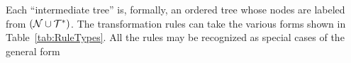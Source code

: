 \documentclass[10pt]{article}
\newcommand{\tabnum}[1]{\ref{tab:#1}}
\newcommand{\tabref}[1]{Table~\tabnum{#1}}
\begin{document}
\newcommand\tinyrhsA{\Tree[ .$\alpha$ [ .$C$ [ .$U$ $\epsilon$ ] [ .$\beta$ ] ] ]}
\newcommand\tinyrhsB{\Tree[ .$\alpha$ [ .$C$ [ .$\beta$ ] [ .$Y$ $\epsilon$ ] ] ]}
\newcommand\tinyrhsC{\Tree[ .$\alpha$ [ .$V$ $\epsilon$ ] [ .$C$ $\beta$ ] ]}
\newcommand\tinyrhsD{\Tree[ .$\alpha$ [ .$C$ $\beta$ ] [ .$X$ $\epsilon$ ] ]}
\newcommand\tinyrhsE{\Tree[ .$\alpha$ [ .$B$ [ .$C$ $\beta$ ] ] ]}
\newcommand\tinyrhsF{\abtree{C}}
 

\newcommand\rhs[6]{\Tree[ .$\alpha$ [ .$#1$ [ .$#3$ $\epsilon$ ] [ .$#2$ [ .$#4$ $\epsilon$ ] $\beta$ [ .$#5$ $\epsilon$ ] ] [ .$#6$ $\epsilon$ ] ] ]}
\newcommand\rhsnob[5]{\Tree[ .$\alpha$ $#2$ [ .$#1$ $#3$ $\beta$ $#4$ ] $#5$ ]}
\newcommand\rhsnoepsilon[6]{\Tree[ .$\alpha$ [ .$#1$ $#3$ [ .$#2$ $#4$ $\beta$ $#5$ ] $#6$ ] ]}
\newcommand\rhsnouvxy[2]{\Tree[ .$\alpha$ [ .$#1$ [ .$#2$ $\beta$ ] ] ]}

\newcommand\rhsGeneric{\rhs{B}{C}{U}{V}{X}{Y}}

\newcommand\rhsA{\Tree[ .$\alpha$ [ .$U$ $\epsilon$ ] [ .$C$ $v$ $\beta$ $x$ ] $y$ ]}
\newcommand\rhsB{\Tree[ .$\alpha$ $u$ [ .$C$ $v$ $\beta$ $x$ ] [ .$Y$ $\epsilon$ ] ]}
\newcommand\rhsC{\Tree[ .$\alpha$ $u$ [ .$C$ [ .$V$ $\epsilon$ ] $\beta$ $x$ ] $y$ ]}
\newcommand\rhsD{\Tree[ .$\alpha$ $u$ [ .$C$ $v$ $\beta$ [ .$X$ $\epsilon$ ] ] $y$ ]}
\newcommand\rhsE{\rhsnoepsilon{B}{C}{u}{v}{x}{y}}
\newcommand\rhsF{\rhsnob{C}{u}{v}{x}{y}}

\newcommand\newickA{((\beta)A)\alpha \to (U,((v,\beta,x)C),y)\alpha}
\newcommand\newickB{((\beta)A)\alpha \to (u,((v,\beta,x)C),Y)\alpha}
\newcommand\newickC{((\beta)A)\alpha \to (u,((V,\beta,x)C),y)\alpha}
\newcommand\newickD{((\beta)A)\alpha \to (u,((v,\beta,X)C),y)\alpha}
\newcommand\newickE{((\beta)A)\alpha \to ((u,((v,\beta,x)C),y)B)\alpha}
\newcommand\newickF{((\beta)A)\alpha \to (u,((v,\beta,x)C),y)\alpha}

\newcommand\longnewickA{((\beta)A)\alpha \to ((\epsilon)U,((v,\beta,x)C),y)\alpha}

Each ``intermediate tree'' is, formally, an ordered tree whose nodes are labeled from
$({\cal N} \cup {\cal T}^\ast)$.
The transformation rules can take the various forms shown in \tabref{RuleTypes}.
All the rules may be recognized as special cases of the general form
\end{document}
